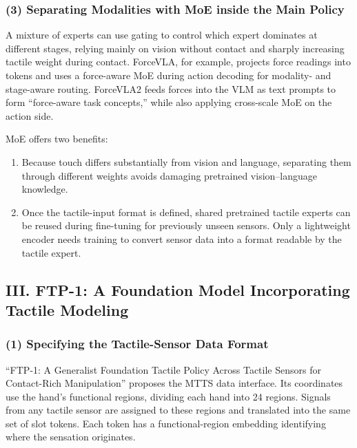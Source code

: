 \hypertarget{separating-modalities-with-moe-inside-the-main-policy}{%
\subsubsection{(3) Separating Modalities with MoE inside the Main Policy}\label{separating-modalities-with-moe-inside-the-main-policy}}

A mixture of experts can use gating to control which expert dominates at different stages, relying mainly on vision without contact and sharply increasing tactile weight during contact. ForceVLA, for example, projects force readings into tokens and uses a force-aware MoE during action decoding for modality- and stage-aware routing. ForceVLA2 feeds forces into the VLM as text prompts to form ``force-aware task concepts,'' while also applying cross-scale MoE on the action side.

MoE offers two benefits:

\begin{enumerate}
\def\labelenumi{\arabic{enumi}.}
\item
  Because touch differs substantially from vision and language, separating them through different weights avoids damaging pretrained vision--language knowledge.
\item
  Once the tactile-input format is defined, shared pretrained tactile experts can be reused during fine-tuning for previously unseen sensors. Only a lightweight encoder needs training to convert sensor data into a format readable by the tactile expert.
\end{enumerate}

\hypertarget{iii.-ftp-1-a-foundation-model-incorporating-tactile-modeling}{%
\subsection{III. FTP-1: A Foundation Model Incorporating Tactile Modeling}\label{iii.-ftp-1-a-foundation-model-incorporating-tactile-modeling}}

\hypertarget{specifying-the-tactile-sensor-data-format}{%
\subsubsection{(1) Specifying the Tactile-Sensor Data Format}\label{specifying-the-tactile-sensor-data-format}}

``FTP-1: A Generalist Foundation Tactile Policy Across Tactile Sensors for Contact-Rich Manipulation'' proposes the MTTS data interface. Its coordinates use the hand's functional regions, dividing each hand into 24 regions. Signals from any tactile sensor are assigned to these regions and translated into the same set of slot tokens. Each token has a functional-region embedding identifying where the sensation originates.


